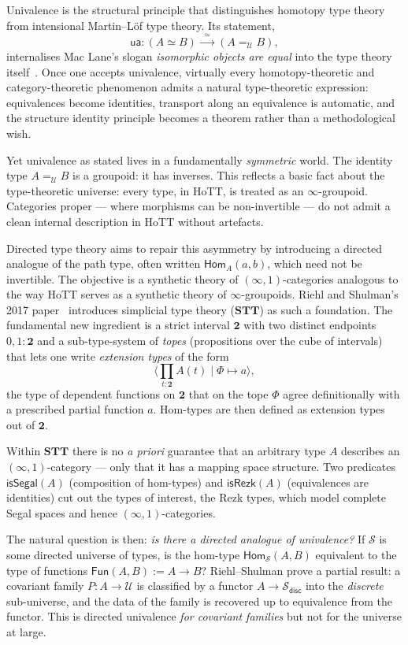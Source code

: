 \documentclass[12pt]{article}
\theoremstyle{definition}
\theoremstyle{remark}
\newcommand{\U}{\mathcal{U}}
\newcommand{\Hom}{\mathsf{Hom}}
\newcommand{\Fun}{\mathsf{Fun}}
\newcommand{\ua}{\mathsf{ua}}
\newcommand{\eqv}{\simeq}
\newcommand{\isSegal}{\mathsf{isSegal}}
\newcommand{\isRezk}{\mathsf{isRezk}}
\newcommand{\disc}{\mathsf{disc}}
\newcommand{\STT}{\mathbf{STT}}
\newcommand{\twoI}{\mathbf{2}}
\begin{document}
Univalence is the structural principle that distinguishes homotopy type theory from intensional Martin--L\"of type theory. Its statement,
\[
\ua : (A \eqv B) \xrightarrow{\;\;\eqv\;\;} (A =_{\U} B),
\]
internalises Mac Lane's slogan \emph{isomorphic objects are equal} into the type theory itself~\cite{HoTTBook,Voevodsky}. Once one accepts univalence, virtually every homotopy-theoretic and category-theoretic phenomenon admits a natural type-theoretic expression: equivalences become identities, transport along an equivalence is automatic, and the structure identity principle becomes a theorem rather than a methodological wish.

Yet univalence as stated lives in a fundamentally \emph{symmetric} world. The identity type $A =_{\U} B$ is a groupoid: it has inverses. This reflects a basic fact about the type-theoretic universe: every type, in HoTT, is treated as an $\infty$-groupoid. Categories proper --- where morphisms can be non-invertible --- do not admit a clean internal description in HoTT without artefacts.

Directed type theory aims to repair this asymmetry by introducing a directed analogue of the path type, often written $\Hom_A(a,b)$, which need not be invertible. The objective is a synthetic theory of $(\infty,1)$-categories analogous to the way HoTT serves as a synthetic theory of $\infty$-groupoids. Riehl and Shulman's 2017 paper~\cite{RiehlShulman} introduces simplicial type theory ($\STT$) as such a foundation. The fundamental new ingredient is a strict interval $\twoI$ with two distinct endpoints $0,1 : \twoI$ and a sub-type-system of \emph{topes} (propositions over the cube of intervals) that lets one write \emph{extension types} of the form
\[
\langle \prod_{t : \twoI} A(t) \mid \Phi \mapsto a \rangle,
\]
the type of dependent functions on $\twoI$ that on the tope $\Phi$ agree definitionally with a prescribed partial function $a$. Hom-types are then defined as extension types out of $\twoI$.

Within $\STT$ there is no \emph{a priori} guarantee that an arbitrary type $A$ describes an $(\infty,1)$-category --- only that it has a mapping space structure. Two predicates $\isSegal(A)$ (composition of hom-types) and $\isRezk(A)$ (equivalences are identities) cut out the types of interest, the Rezk types, which model complete Segal spaces and hence $(\infty,1)$-categories.

The natural question is then: \emph{is there a directed analogue of univalence?} If $\mathcal{S}$ is some directed universe of types, is the hom-type $\Hom_{\mathcal{S}}(A,B)$ equivalent to the type of functions $\Fun(A,B) := A \to B$? Riehl--Shulman prove a partial result: a covariant family $P : A \to \U$ is classified by a functor $A \to \mathcal{S}_{\disc}$ into the \emph{discrete} sub-universe, and the data of the family is recovered up to equivalence from the functor. This is directed univalence \emph{for covariant families} but not for the universe at large.
\end{document}

